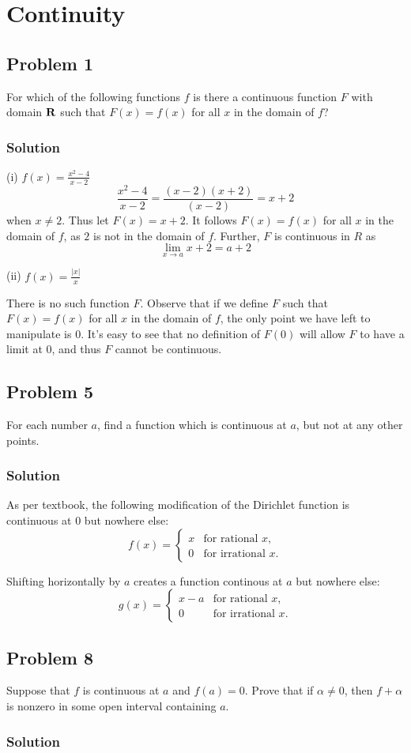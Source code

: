 \section{Continuity}
\subsection*{Problem 1}
For which of the following functions $f$ is there a continuous function $F$ with domain $\mathbf{R}$ such that $F(x)=f(x)$ for all $x$ in the domain of $f$?

\subsubsection*{Solution}
(i) $f(x)=\frac{x^2-4}{x-2}$
\[\frac{x^2-4}{x-2}=\frac{(x-2)(x+2)}{(x-2)}=x+2\]
when $x\neq 2$. Thus let $F(x)=x+2$. It follows $F(x)=f(x)$ for all $x$ in the domain of $f$, as $2$ is not in the domain of $f$. Further, $F$ is continuous in $R$ as
\[\lim_{x\to a}x+2=a+2\]

(ii) $f(x)=\frac{|x|}{x}$

There is no such function $F$. Observe that if we define $F$ such that $F(x)=f(x)$ for all $x$ in the domain of $f$, the only point we have left to manipulate is $0$. It's easy to see that no definition of $F(0)$ will allow $F$ to have a limit at $0$, and thus $F$ cannot be continuous.

\subsection*{Problem 5}
For each number $a$, find a function which is continuous at $a$, but not at any other points.

\subsubsection*{Solution}
As per textbook, the following modification of the Dirichlet function
is continuous at $0$ but nowhere else:
\[
f(x) = 
\begin{cases} 
x & \text{for rational } x,\\
0 & \text{for irrational } x.
\end{cases}
\]

Shifting horizontally by $a$ creates a function continous at $a$ but
nowhere else:
\[
g(x) = 
\begin{cases} 
x-a & \text{for rational } x,\\
0 & \text{for irrational } x.
\end{cases}
\]


\subsection*{Problem 8}
Suppose that $f$ is continuous at $a$ and $f(a)=0$. Prove that if $\alpha\neq 0$, then $f+\alpha$ is nonzero in some open interval containing $a$.

\subsubsection*{Solution}

